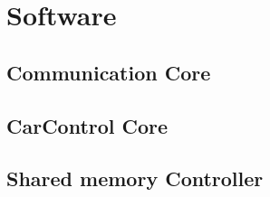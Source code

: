 \chapter{Software}

\section{Communication Core}

\section{CarControl Core}

\section{Shared memory Controller}
